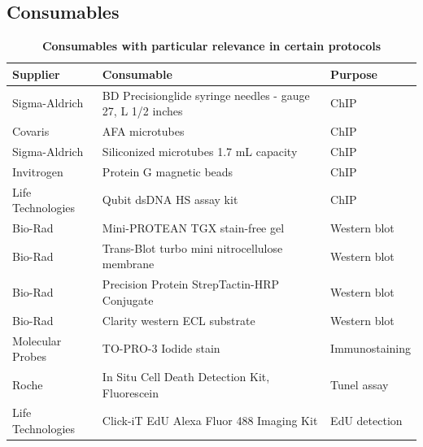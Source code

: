 \documentclass[11pt,twoside,a4paper]{report}
\begin{document}
	    \subsection{Consumables}
	    \label{subsection:consumables}
			\begin{table}[H]
       			\caption{\bf{Consumables with particular relevance in certain protocols}}
        		\begin{center}
            		\begin{tabular}{p{2.9cm} | p{8.2cm} | p{2.2cm}}
	                	\textbf{Supplier} & \textbf{Consumable} &  \textbf{Purpose}\\
    		            \hline
    		            Sigma-Aldrich & BD Precisionglide syringe needles - gauge 27, L 1/2 inches & ChIP\\
						Covaris & AFA microtubes & ChIP\\
						Sigma-Aldrich & Siliconized microtubes 1.7 mL capacity & ChIP\\
        		        Invitrogen & Protein G magnetic beads & ChIP\\
        		        Life Technologies & Qubit dsDNA HS assay kit & ChIP\\
        		        Bio-Rad & Mini-PROTEAN TGX stain-free gel & Western blot\\
        		        Bio-Rad & Trans-Blot turbo mini nitrocellulose membrane & Western blot\\
						Bio-Rad & Precision Protein StrepTactin-HRP Conjugate & Western blot\\
        		        Bio-Rad & Clarity western ECL substrate & Western blot\\
        		        Molecular Probes & TO-PRO-3 Iodide stain & Immunostaining\\
        		        Roche & In Situ Cell Death Detection Kit, Fluorescein & Tunel assay\\
        		        Life Technologies & Click-iT EdU Alexa Fluor 488 Imaging Kit & EdU detection\\        		        
	            	\end{tabular}
    		    \end{center}
		    \end{table}
    
\end{document}
